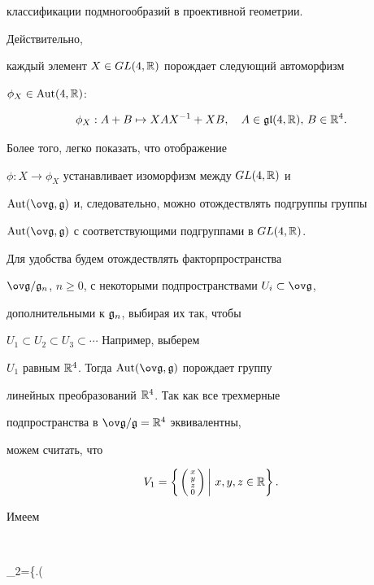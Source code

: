 классификации подмногообразий в проективной геометрии.


Действительно,


каждый элемент $X\in GL(4,\Bbb R)$ порождает следующий автоморфизм


$\phi_X\in\operatorname{Aut}(4,\Bbb R)$:


$$


\phi_X: A+B\mapsto XAX^{-1}+XB,\quad


A\in\gl(4,\Bbb R),\,B\in\Bbb R^4.


$$


Более того, легко показать, что отображение


$\phi: X\to\phi_X$ устанавливает изоморфизм между $GL(4,\Bbb R)$ и


$\Aut(\gb,\g)$ и, следовательно, можно отождествлять подгруппы группы


$\Aut(\gb,\g)$ с соответствующими подгруппами в $GL(4,\Bbb R)$.


 


Для удобства будем отождествлять факторпространства


$\gb/\g_n$, $n\ge 0$, с некоторыми подпространствами $U_i\subset\gb$,


дополнительными к $\frak g_n$, выбирая их так, чтобы


$U_1\subset U_2\subset U_3\subset \dotsb$ Например, выберем


$U_1$ равным $\Bbb R^4$. Тогда $\Aut(\gb,\g)$ порождает группу


линейных преобразований $\Bbb R^4$. Так как все трехмерные


подпространства в $\gb/\g=\Bbb R^4$ эквивалентны,


можем считать, что


$$


V_1=\left\{\left.\left(\begin{smallmatrix}


x\\y\\z\\0\end{smallmatrix}\right)\,\right|\,x,y,z\in


\Bbb R\right\}.


$$





Имеем


$$


\g_2=\left\{\left.\left(



